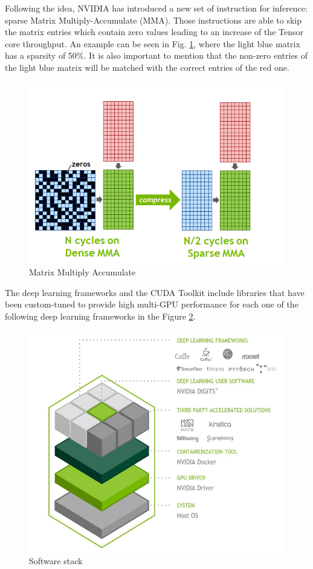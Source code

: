 Following the idea, NVIDIA has introduced a new set of instruction for inference: sparse Matrix Multiply-Accumulate (MMA). Those instructions are able to skip the matrix entries which contain zero values leading to an increase of the Tensor core throughput. An example can be seen in Fig. \ref{fig:mma}, where the light blue matrix has a sparsity of 50\%. It is also important to mention that the non-zero entries of the light blue matrix will be matched with the correct entries of the red one.
\begin{figure}[!htbp]
\centering
\captionsetup{justification=centering}
\includegraphics[scale=0.35]{./figure/mma.png}
\caption{Matrix Multiply Accumulate\cite{paper:41}}
\label{fig:mma}
\end{figure}

\newpage
The deep learning frameworks and the CUDA Toolkit include libraries that have been custom-tuned to provide high multi-GPU performance for each one of the following deep learning frameworks in the Figure \ref{fig:swtesla}.

\begin{figure}[!htbp]
\centering
\captionsetup{justification=centering}
\includegraphics[scale=0.6]{./figure/sw_stack_tesla.PNG}
\caption{Software stack\cite{paper:41}}
\label{fig:swtesla}
\end{figure}

